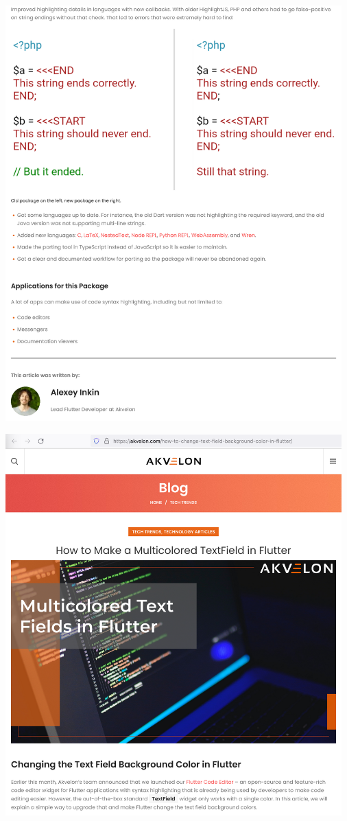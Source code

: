 \begin{center}
    \includegraphics[width=35em]{ported-bottom}
\end{center}
\pagebreak

\begin{center}
    \includegraphics[width=35em]{multicolor-p1}
\end{center}
\pagebreak

